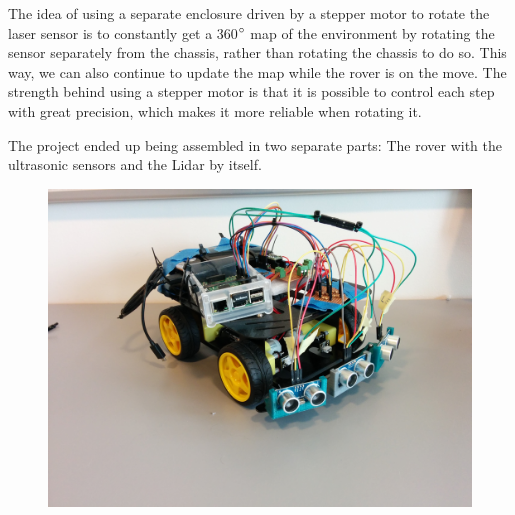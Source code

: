 The idea of using a separate enclosure driven by a stepper motor to rotate the laser sensor is to constantly get a 360$\degree$ map of the environment by rotating the sensor separately from the chassis, rather than rotating the chassis to do so. This way, we can also continue to update the map while the rover is on the move. The strength behind using a stepper motor is that it is possible to control each step with great precision, which makes it more reliable when rotating it.

The project ended up being assembled in two separate parts: The rover with the ultrasonic sensors and the Lidar by itself.

\begin{figure}[H]
	\centering
	\includegraphics[width=.6\linewidth]{images/build_ultrasonic.jpg}
\end{figure}